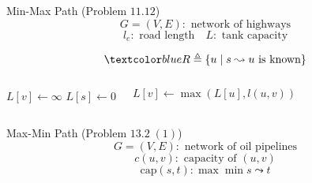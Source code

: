 \begin{frame}{}
  \begin{exampleblock}{Min-Max Path (Problem $11.12$)}
    \[
      G = (V, E): \text{ network of highways}
    \]
    \[
      l_e: \text{ road length} \quad L: \text{ tank capacity}
    \]
	  
    \vspace{0.30cm}
    \centerline{}
  \end{exampleblock}

  \pause
  \[
    \blue{R \triangleq \set{u \mid s \leadsto u \text{ is known}}}
  \]

  \pause
  \begin{columns}
      \begin{algorithmic}
	  \State $L[v] \gets \infty$
	\EndFor
	\State $L[s] \gets 0$
      \end{algorithmic}
      \begin{algorithmic}
	  \State $L[v] \gets \max(L[u], l(u,v))$
	\EndIf
      \end{algorithmic}
  \end{columns}
\end{frame}
\begin{frame}{}
  \begin{exampleblock}{Max-Min Path (Problem $13.2\; (1)$)}
    \[
      G = (V, E): \text{ network of oil pipelines}
    \]
    \[
      c(u,v): \text{ capacity of } (u,v)
    \]
    \[
      \text{cap}(s,t): \max \min s \leadsto t
    \]
    
    \vspace{0.30cm}
    \centerline{}
  \end{exampleblock}

  \pause
\end{frame}

